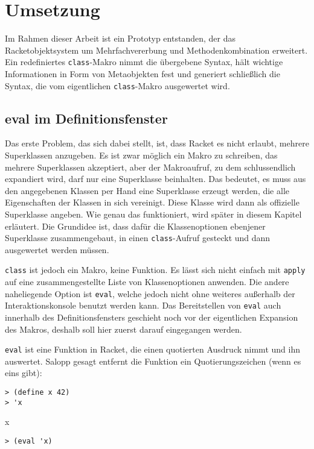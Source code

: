 \chapter{Umsetzung}  
\label{implementation}

\vspace{-0.4cm}
Im Rahmen dieser Arbeit ist ein Prototyp entstanden, der das Racketobjektsystem um Mehrfachvererbung und Methodenkombination erweitert. Ein redefiniertes \texttt{class}-Makro nimmt die übergebene Syntax, hält wichtige Informationen in Form von Metaobjekten fest und generiert schließlich die Syntax, die vom eigentlichen \texttt{class}-Makro ausgewertet wird.
\vspace{-0.2cm}

\section{eval im Definitionsfenster}
\vspace{-0.4cm}
Das erste Problem, das sich dabei stellt, ist, dass Racket es nicht erlaubt, mehrere Superklassen anzugeben. Es ist zwar möglich ein Makro zu schreiben, das mehrere Superklassen akzeptiert, aber der Makroaufruf, zu dem schlussendlich expandiert wird, darf nur eine Superklasse beinhalten. Das bedeutet, es muss aus den angegebenen Klassen per Hand eine Superklasse erzeugt werden, die alle Eigenschaften der Klassen in sich vereinigt. Diese Klasse wird dann als offizielle Superklasse angeben. Wie genau das funktioniert, wird später in diesem Kapitel erläutert. Die Grundidee ist, dass dafür die Klassenoptionen ebenjener Superklasse zusammengebaut, in einen \texttt{class}-Aufruf gesteckt und dann ausgewertet werden müssen.

\texttt{class} ist jedoch ein Makro, keine Funktion. Es lässt sich nicht einfach mit \texttt{apply} auf eine zusammengestellte Liste von Klassenoptionen anwenden. Die andere naheliegende Option ist \texttt{eval}, welche jedoch nicht ohne weiteres außerhalb der Interaktionskonsole benutzt werden kann. Das Bereitstellen von \texttt{eval} auch innerhalb des Definitionsfensters geschieht noch vor der eigentlichen Expansion des Makros, deshalb soll hier zuerst darauf eingegangen werden.

\texttt{eval} ist eine Funktion in Racket, die einen quotierten Ausdruck nimmt und ihn auswertet. Salopp gesagt entfernt die Funktion ein Quotierungszeichen (wenn es eins gibt):

\begin{lstlisting}
> (define x 42)
> 'x
\end{lstlisting}
{\rsymbol x}
\vspace{-1em}
\begin{lstlisting}
> (eval 'x)
\end{lstlisting}
{}

